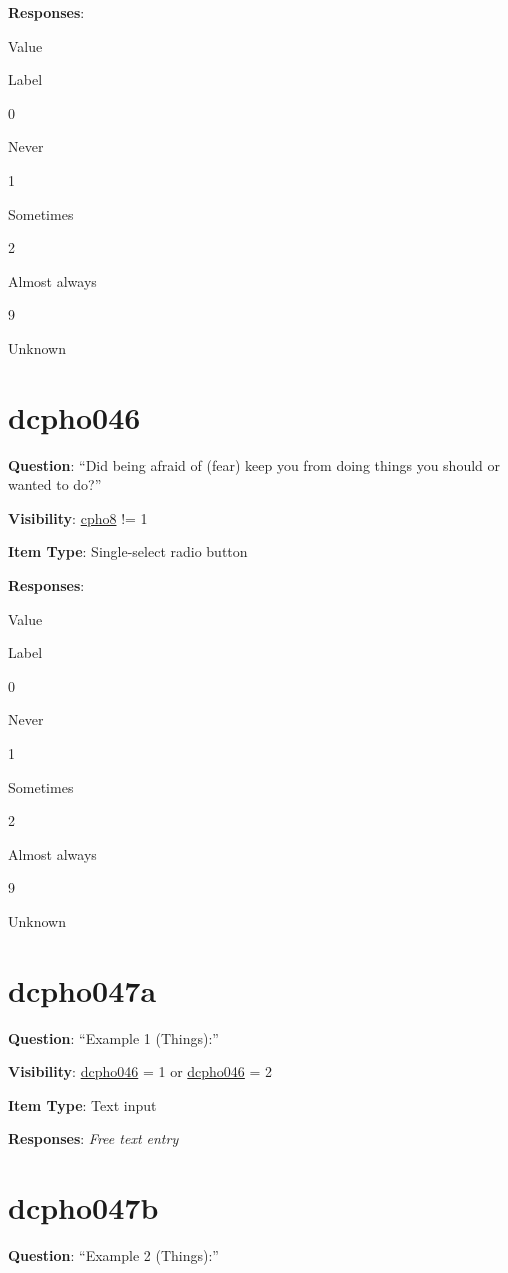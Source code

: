 \documentclass[]{book}
\begin{document}
\textbf{Responses}:

Value

Label

0

Never

1

Sometimes

2

Almost always

9

Unknown

\hypertarget{dcpho046}{%
\section{dcpho046}\label{dcpho046}}

\textbf{Question}: ``Did being afraid of (fear) keep you from doing things you should or wanted to do?''

\textbf{Visibility}: \protect\hyperlink{cpho8}{cpho8} != 1

\textbf{Item Type}: Single-select radio button

\textbf{Responses}:

Value

Label

0

Never

1

Sometimes

2

Almost always

9

Unknown

\hypertarget{dcpho047a}{%
\section{dcpho047a}\label{dcpho047a}}

\textbf{Question}: ``Example 1 (Things):''

\textbf{Visibility}: \protect\hyperlink{dcpho046}{dcpho046} = 1 or \protect\hyperlink{dcpho046}{dcpho046} = 2

\textbf{Item Type}: Text input

\textbf{Responses}: \emph{Free text entry}

\hypertarget{dcpho047b}{%
\section{dcpho047b}\label{dcpho047b}}

\textbf{Question}: ``Example 2 (Things):''
\end{document}
